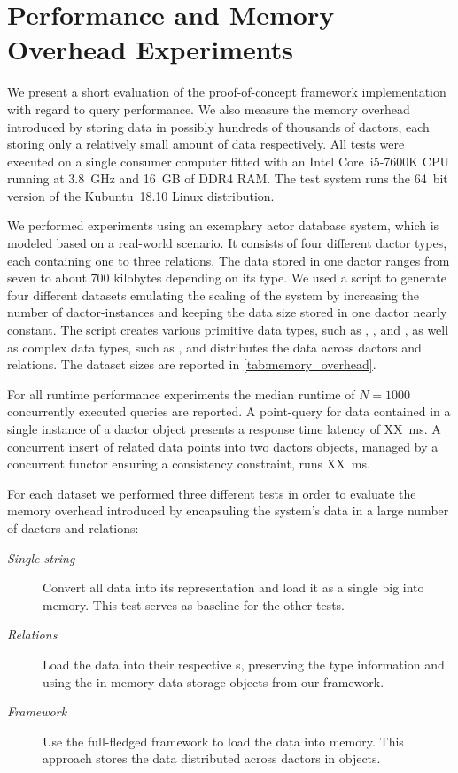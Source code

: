 

\section[Performance and Memory Overhead Experiments]{Performance and Memory Overhead Experiments}\label{sec:experiments}

  We present a short evaluation of the proof-of-concept framework implementation with regard to query performance.
  We also measure the memory overhead introduced by storing data in possibly hundreds of thousands of \glspl{dactor}, each storing only a relatively small amount of data respectively. 
  All tests were executed on a single consumer computer fitted with an Intel Core~i5-7600K CPU running at 3.8~GHz and 16~GB of DDR4 RAM.
  The test system runs the 64~bit version of the Kubuntu~18.10 Linux distribution.

  We performed experiments using an exemplary actor database system, which is modeled based on a real-world scenario.
  It consists of four different \gls{dactor} types, each containing one to three relations.
  The data stored in one \gls{dactor} ranges from seven to about 700 kilobytes depending on its type.
  We used a script to generate four different datasets emulating the scaling of the system by increasing the number of \gls{dactor}-instances and keeping the data size stored in one \gls{dactor} nearly constant.
  The script creates various primitive data types, such as , , and , as well as complex data types, such as , and distributes the data across \glspl{dactor} and relations.
  The dataset sizes are reported in \cref{tab:memory_overhead}.

  For all runtime performance experiments the median runtime of $N=1000$ concurrently executed queries are reported.
  A point-query for data contained in a single instance of a \gls{dactor} object presents a response time latency of XX~ms.
  A concurrent insert of related data points into two \glspl{dactor} objects, managed by a concurrent functor ensuring a consistency constraint, runs XX~ms.

  For each dataset we performed three different tests in order to evaluate the memory overhead introduced by encapsuling the system's data in a large number of \glspl{dactor} and relations:
  \begin{description}
    \item[\textit{Single string}] Convert all data into its  representation and load it as a single big  into memory.
    This test serves as baseline for the other tests.
    \item[\textit{Relations}] Load the data into their respective s, preserving the type information and using the in-memory data storage objects from our framework.
    \item[\textit{Framework}] Use the full-fledged framework to load the data into memory.
    This approach stores the data distributed across \glspl{dactor} in  objects.
  \end{description}

